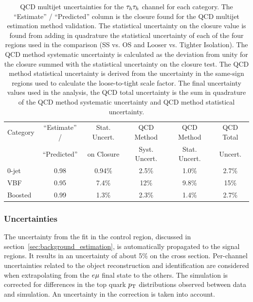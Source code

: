 \begin{table}[htbp]
\centering
\begin{tabular}{|l|c|c|c|c|c|}
\hline
Category & ``Estimate'' /  & Stat. Uncert. &  QCD Method    &  QCD Method    &  QCD Total \\
         & ``Predicted''   &    on Closure &  Syst. Uncert. &  Stat. Uncert. &  Uncert.   \\
\hline
0-jet    & 0.98 & 0.94\% & 2.5\% & 1.0\%  & 2.7\%  \\\hline
VBF      & 0.95 & 7.4\%  & 12\%  & 9.8\%  & 15\%   \\\hline
Boosted  & 0.99 & 1.3\%  & 2.3\% & 1.4\%  & 2.7\%  \\\hline
\end{tabular}
\label{tab:htt_tt_qcd_closure}
\caption{
QCD multijet uncertainties for the $\tau_{h}\tau_{h}$ channel for each category. The ``Estimate'' /
``Predicted'' column is the closure found for the QCD multijet estimation method validation.
The statistical uncertainty on the closure value is found from adding in quadrature the statistical uncertainty
of each of the four regions used in the comparison (SS vs. OS and Looser vs. Tighter Isolation).
The QCD method systematic uncertainty is calculated as the deviation from unity for the closure summed
with the statistical uncertainty on the closure test. The QCD method statistical uncertainty
is derived from the uncertainty in the same-sign regions used to calculate the loose-to-tight
scale factor. The final uncertainty values used in the analysis, the QCD total uncertainty is the sum in 
quadrature of the QCD method systematic uncertainty and QCD method statistical uncertainty.
}
\end{table}


\subsubsection{\ttbar Uncertainties}
The uncertainty from the fit in the \ttbar control region, discussed in section~\ref{sec:background_estimation}, 
is automatically propagated to the signal regions. It results in an uncertainty of about 5\% on the 
\ttbar cross section. Per-channel uncertainties related to the object reconstruction and identification are 
considered when extrapolating from the $e\mu$ final state to the others. The \ttbar simulation is corrected 
for differences in the top quark $p_\mathrm{T}$ distributions observed between data and simulation. An uncertainty 
in the correction is taken into account.


